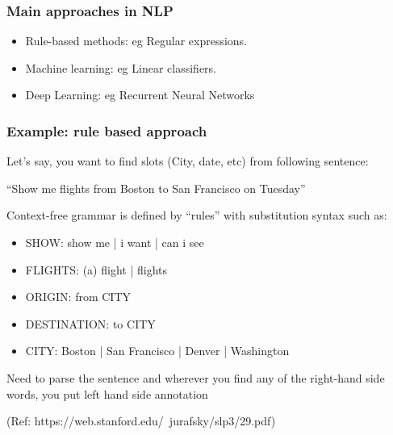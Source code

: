 \begin{frame}[fragile]\frametitle{Main approaches in NLP}
  \begin{itemize}
    \item Rule-based methods: eg Regular expressions.
    \item  Machine learning: eg Linear classifiers.
    \item Deep Learning: eg Recurrent Neural Networks
  \end{itemize}
\end{frame}



\begin{frame}[fragile]\frametitle{Example: rule based approach}
Let's say, you want to find slots (City, date, etc) from following sentence:

``Show me flights from Boston to San Francisco on Tuesday''

Context-free grammar is defined by ``rules'' with substitution syntax such as:

  \begin{itemize}
    \item SHOW:   show me | i want | can i see
    \item FLIGHTS:   (a) flight | flights
    \item ORIGIN:   from CITY
    \item DESTINATION: to CITY
    \item CITY:  Boston | San Francisco | Denver | Washington
  \end{itemize}
Need to parse the sentence and wherever you find any of the right-hand side words, you put left hand side annotation

{\tiny (Ref: https://web.stanford.edu/~jurafsky/slp3/29.pdf)}
\end{frame}



